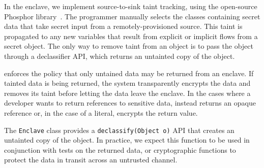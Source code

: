 
In the enclave, we implement source-to-sink taint tracking, using the open-source Phosphor library~\citep{phosphor}.
The programmer manually selects the classes containing secret data that take secret input from a remotely-provisioned source.
This taint is propagated to any new variables that result from explicit or implicit flows from a secret object.
The only way to remove taint from an object is to pass the object through a \sysname{} declassifier API,
which returns an untainted copy of the object.


\sysname{} enforces the policy that only untained data may be returned from an enclave.
If tainted data is being returned, the system transparently encrypts the data and removes its taint before letting the data leave the enclave.
In the cases where a developer wants to return references to sensitive data, \sysname{} instead returns an opaque reference or, in the case of a literal, encrypts the return value.



The \sysname{} {\tt Enclave} class provides a {\tt declassify(Object o)} API that creates an untainted
copy of the object.  In practice, we expect this function to be used in conjunction with tests
on the returned data, or cryptographic functions to protect the data in transit across an untrusted channel.

